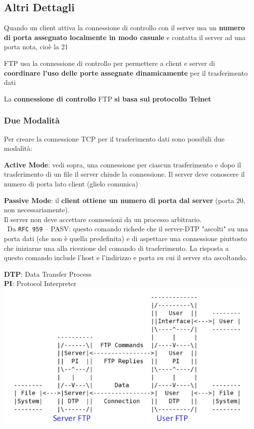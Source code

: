 \documentclass[10pt]{article}
\begin{document}
\subsection{Altri Dettagli}
\begin{list}{}{}
\item Quando un client attiva la connessione di controllo con il server usa un \textbf{numero di porta assegnato localmente in modo casuale} e contatta il server ad una porta nota, cioè la 21
\item FTP usa la connessione di controllo per permettere a client e server di \textbf{coordinare l'uso delle porte assegnate dinamicamente} per il trasferimento dati
\item La \textbf{connessione di controllo} FTP \textbf{si basa sul protocollo Telnet}
\item \subsubsection{Due Modalità} Per creare la connessione TCP per il trasferimento dati sono possibili due modalità:
\begin{list}{}{}
\item \textbf{Active Mode}: vedi sopra, una connessione per ciascun trasferimento e dopo il trasferimento di un file il server chiude la connessione. Il server deve conoscere il numero di porta lato client (glielo comunica)
\item \textbf{Passive Mode}: il \textbf{client ottiene un numero di porta dal server} (porta 20, non necessariamente).\\
Il server non deve accettare connessioni da un processo arbitrario.\\\
Da \texttt{RFC 959} -- PASV: questo comando richede che il server-DTP "ascolti" su una porta dati (che non è quella predefinita) e di aspettare una connessione piuttosto che iniziarne una alla ricezione del comando di trasferimento. La risposta a questo comando include l'host e l'indirizzo e porta su cui il server sta ascoltando.
\end{list}
\end{list}
\textbf{DTP}: Data Transfer Process\\
\textbf{PI}: Protocol Interpreter\\
\includegraphics[scale=0.75]{modelloftp2.png}
\end{document}
